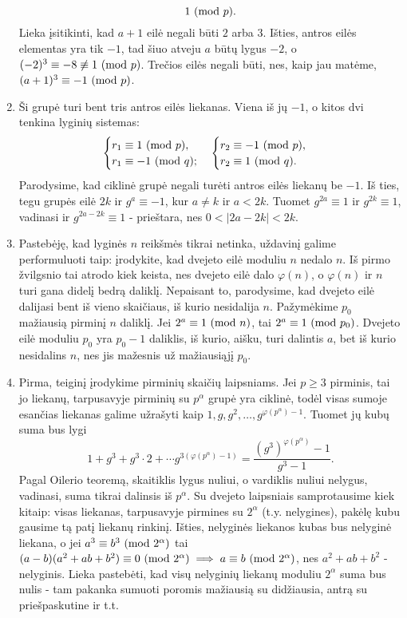 \begin{enumerate}
$$    1\ (\text{mod } p).$$ Lieka įsitikinti, kad $a+1$ eilė negali būti $2$ arba
    $3$. Išties, antros eilės elementas yra tik $-1$, tad šiuo atveju
    $a$ būtų lygus $-2$, o $(-2)^3 \equiv -8 \not \equiv 1\ (\text{mod } p)$. Trečios
    eilės negali būti, nes, kaip jau matėme, $(a+1)^3 \equiv -1 \ (\text{mod } p)$.
\item
    Ši grupė turi bent tris antros eilės liekanas. Viena iš jų $-1$, o
    kitos dvi tenkina lyginių sistemas: $$
    \begin{cases}
      r_1 \equiv 1 \ (\text{mod } p),\\
      r_1 \equiv -1 \ (\text{mod } q);
    \end{cases}
    \begin{cases}
      r_2 \equiv -1 \ (\text{mod } p),\\
      r_2 \equiv 1 \ (\text{mod } q).
    \end{cases}$$
    Parodysime, kad ciklinė grupė negali turėti antros eilės liekanų be
    $-1$. Iš ties, tegu grupės eilė $2k$ ir $g^a \equiv -1$, kur
    $a \neq k$ ir $a < 2k$. Tuomet $g^{2a}\equiv 1$ ir $g^{2k} \equiv 1$, vadinasi ir
    $g^{2a-2k}\equiv 1$ - prieštara, nes $0<|2a - 2k|< 2k$.
\item
    Pastebėję, kad lyginės $n$ reikšmės tikrai netinka, uždavinį galime
    performuluoti taip: įrodykite, kad dvejeto eilė moduliu $n$ nedalo
    $n$. Iš pirmo žvilgsnio tai atrodo kiek keista, nes dvejeto eilė dalo
    $\varphi(n)$, o $\varphi(n)$ ir $n$ turi gana didelį bedrą daliklį.
    Nepaisant to, parodysime, kad dvejeto eilė dalijasi bent iš vieno
    skaičiaus, iš kurio nesidalija $n$. Pažymėkime $p_0$ mažiausią pirminį
    $n$ daliklį. Jei $2^a \equiv 1 \ (\text{mod } n)$, tai $2^a \equiv 1 \ (\text{mod } p_0)$.
    Dvejeto eilė moduliu $p_0$ yra $p_0-1$ daliklis, iš kurio, aišku, turi
    dalintis $a$, bet iš kurio nesidalins $n$, nes jis mažesnis už
    mažiausiąjį $p_0$.
\item
    Pirma, teiginį įrodykime pirminių skaičių laipsniams. Jei $p\geq 3$
    pirminis, tai jo liekanų, tarpusavyje pirminių su $p^{\alpha}$ grupė
    yra ciklinė, todėl visas sumoje esančias liekanas galime užrašyti kaip
    $1, g, g^2, \dots, g^{\varphi(p^{\alpha})-1}$. Tuomet jų kubų suma bus lygi
    $$1 + g^3 + g^3\cdot 2 + \cdots g^{3 (\varphi(p^\alpha)-1)} =
    \frac{(g^3)^{\varphi(p^{\alpha})}-1}{g^3 - 1}.$$ Pagal Oilerio teoremą,
    skaitiklis lygus nuliui, o vardiklis nuliui nelygus, 
    vadinasi, suma tikrai dalinsis iš $p^{\alpha}$. Su dvejeto laipsniais
    samprotausime kiek kitaip: visas liekanas, tarpusavyje pirmines su
    $2^{\alpha}$ (t.y. nelygines), pakėlę kubu gausime tą patį liekanų
    rinkinį. Išties, nelyginės liekanos kubas bus nelyginė liekana, o
    jei $a^3 \equiv b^3 \ (\text{mod } 2^{\alpha})$ tai $(a-b)(a^2 + ab + b^2) \equiv
    0\ (\text{mod } 2^{\alpha}) \implies a\equiv b\ (\text{mod } 2^{\alpha})$, nes $a^2 + ab +
    b^2$ -nelyginis. Lieka pastebėti, kad visų nelyginių liekanų moduliu
    $2^{\alpha}$ suma bus nulis - tam pakanka sumuoti poromis mažiausią
    su didžiausia, antrą su priešpaskutine ir t.t.
    

\end{enumerate}
